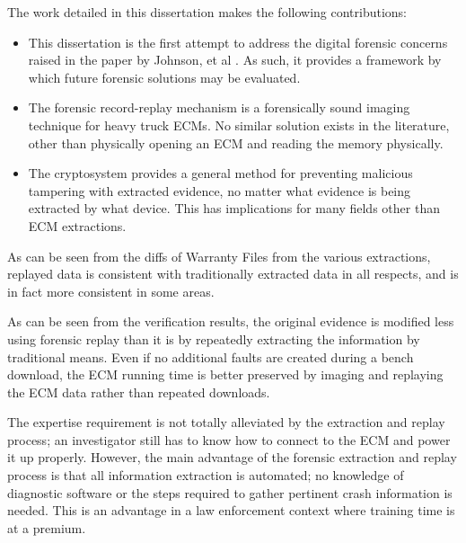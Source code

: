 

The work detailed in this dissertation makes the following contributions:

\begin{itemize}

  \item This dissertation is the first attempt to address the digital forensic concerns raised in the
        paper by Johnson, et al \cite{Johnson2014}. As such, it provides a framework by which future
        forensic solutions may be evaluated.
  \item The forensic record-replay mechanism is a forensically sound imaging technique for heavy truck ECMs.
        No similar solution exists in the literature, other than physically opening an ECM and reading the
        memory physically.
  \item The cryptosystem provides a general method for preventing malicious tampering with extracted evidence,
        no matter what evidence is being extracted by what device. This has implications for many fields other
        than ECM extractions.

\end{itemize}


As can be seen from the diffs of Warranty Files from the various extractions, replayed data is consistent with
traditionally extracted data in all respects, and is in fact more consistent in some areas.


As can be seen from the verification results, the original evidence is modified less using forensic replay than it is by repeatedly
extracting the information by traditional means. Even if no additional faults are created during a bench download, the ECM running
time is better preserved by imaging and replaying the ECM data rather than repeated downloads.

The expertise requirement is not totally alleviated by the extraction and replay process; an investigator still has to know how to 
connect to the ECM and power it up properly. However, the main advantage of the forensic extraction and replay process is that
all information extraction is automated; no knowledge of diagnostic software or the steps required to gather pertinent crash information
is needed. This is an advantage in a law enforcement context where training time is at a premium.


